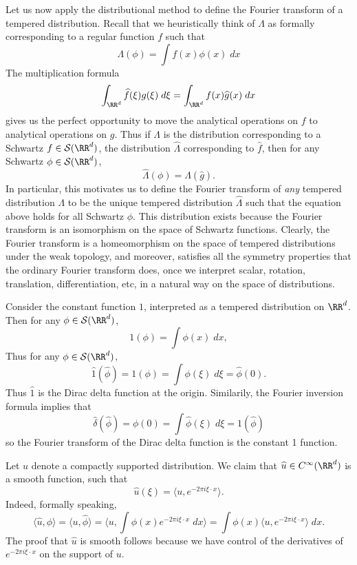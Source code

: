 Let us now apply the distributional method to define the Fourier transform of a tempered distribution. Recall that we heuristically think of $\Lambda$ as formally corresponding to a regular function $f$ such that
%
\[ \Lambda(\phi) = \int f(x) \phi(x)\; dx \]
%
The multiplication formula
%
\[ \int_{\RR^d} \widehat{f}(\xi) g(\xi)\; d\xi = \int_{\RR^d} f(x) \widehat{g}(x)\; dx \]
%
gives us the perfect opportunity to move the analytical operations on $f$ to analytical operations on $g$. Thus if $\Lambda$ is the distribution corresponding to a Schwartz $f \in \mathcal{S}(\RR^d)$, the distribution $\widehat{\Lambda}$ corresponding to $\widehat{f}$, then for any Schwartz $\phi \in \mathcal{S}(\RR^d)$,
%
\[ \widehat{\Lambda}(\phi) = \Lambda \left( \widehat{g} \right). \]
%
In particular, this motivates us to define the Fourier transform of \emph{any} tempered distribution $\Lambda$ to be the unique tempered distribution $\widehat{\Lambda}$ such that the equation above holds for all Schwartz $\phi$. This distribution exists because the Fourier transform is an isomorphism on the space of Schwartz functions. Clearly, the Fourier transform is a homeomorphism on the space of tempered distributions under the weak topology, and moreover, satisfies all the symmetry properties that the ordinary Fourier transform does, once we interpret scalar, rotation, translation, differentiation, etc, in a natural way on the space of distributions.

\begin{example}
    Consider the constant function $1$, interpreted as a tempered distribution on $\RR^d$. Then for any $\phi \in \mathcal{S}(\RR^d)$,
    \[ 1(\phi) = \int \phi(x)\; dx, \]
    Thus for any $\phi \in \mathcal{S}(\RR^d)$,
    \[ \widehat{1} \left( \widehat{\phi} \right) = 1(\phi) = \int \phi(\xi)\; d\xi = \widehat{\phi}(0). \]
    Thus $\widehat{1}$ is the Dirac delta function at the origin. Similarily, the Fourier inversion formula implies that
    \[ \widehat{\delta} \left( \widehat{\phi} \right) = \phi(0) = \int \widehat{\phi}(\xi)\; d\xi = 1 \left( \widehat{\phi} \right) \]
    so the Fourier transform of the Dirac delta function is the constant 1 function.
\end{example}

\begin{example}
    Let $u$ denote a compactly supported distribution. We claim that $\widehat{u} \in C^\infty(\RR^d)$ is a smooth function, such that
    \[ \widehat{u}(\xi) = \langle u, e^{-2 \pi i \xi \cdot x} \rangle. \]
    Indeed, formally speaking,
    \[ \langle \widehat{u}, \phi \rangle = \langle u, \widehat{\phi} \rangle = \langle u, \int \phi(x) e^{-2 \pi i \xi \cdot x}\; dx \rangle = \int \phi(x) \langle u, e^{-2 \pi i \xi \cdot x} \rangle\; dx. \]
    The proof that $\widehat{u}$ is smooth follows because we have control of the derivatives of $e^{-2 \pi i \xi \cdot x}$ on the support of $u$. 
\end{example}

